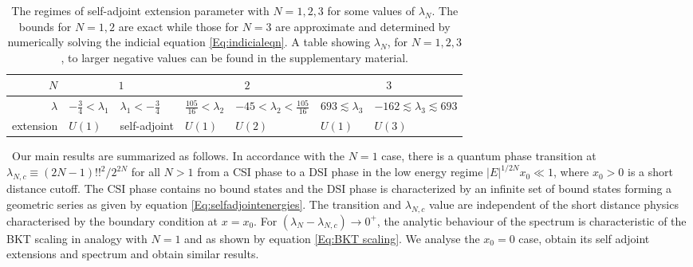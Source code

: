 \documentclass[aps,prl,reprint,preprintnumbers]{revtex4-1}
\begin{document}
\begin{table*}[!t]
  \centering
  \begin{ruledtabular}
  \begin{tabular}{rCCCCCC}
    \; $N$ \; 		      &   	    &  				              
			      &                                   \\ \hline
    \; $\lambda$ \;           & $-\frac{3}{4} < \lambda_{1} $ & $ \lambda_{1} < -\frac{3}{4} $ & $\frac{105}{16} < \lambda_{2} $ & $ -45 < \lambda_{2} < \frac{105}{16}  $ 
			      & $ 693 \lesssim \lambda_{3} $  &  $ -162 \lesssim \lambda_{3}  \lesssim  693$ \\ \hline
    \; extension    \; &  $U(1)$ 	    & \; self-adjoint \;	             	&  $U(1)$                   	
			      & $U(2)$      &  $U(1)$ 	    & $U(3)$
  \end{tabular}
  \end{ruledtabular}
  \caption{The regimes of self-adjoint extension parameter with $N=1,2,3$ for some values of $\lambda_{N}$. The bounds for $N=1,2$ are exact while those for $N=3$ are approximate and determined by numerically solving the indicial equation \eqref{Eq:indicialeqn}. A table showing $\lambda_{N}$, for $N=1,2,3$, to larger negative values can be found in the supplementary material.}
  \label{tab:SAEparamregimes}
  \vspace{-1em}
\end{table*}

{\ Our main results are summarized as follows. In accordance with the $N = 1$ case, there is a quantum phase transition at $\lambda_{N,c} \equiv (2N-1)!!^{2}/2^{2N}$ for all $N>1$ from a CSI phase to a DSI phase in the low energy regime $|E|^{1/2N}x_0 \ll 1$, where $x_0 > 0$ is a short distance cutoff. The CSI phase contains no bound states and the DSI phase is characterized by an infinite set of bound states forming a geometric series as given by equation \eqref{Eq:selfadjointenergies}. The transition and $\lambda_{N,c}$ value are independent of the short distance physics characterised by the boundary condition at $x = x_0$. For $\left( \lambda_N - \lambda_{N,c} \right) \rightarrow 0^+$, the analytic behaviour of the spectrum is characteristic of the BKT scaling in analogy with $N = 1$ \cite{PhysRevB.46.12664,Kaplan:2009kr} and as shown by equation \eqref{Eq:BKT scaling}. We analyse the $x_0 = 0$ case, obtain its self adjoint extensions and spectrum and obtain similar results.}
\end{document}
